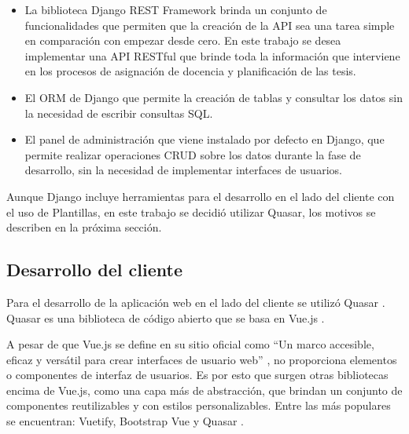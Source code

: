 \begin{itemize}
    \item La biblioteca Django REST Framework brinda un conjunto de funcionalidades 
    que permiten que la creación de la API sea una tarea simple en comparación con empezar desde cero. En este trabajo se desea implementar una API RESTful que brinde toda la 
    información que interviene en los procesos de asignación de docencia y planificación de las 
    tesis. 
    \item El ORM de Django que permite la creación de tablas y consultar los datos sin la necesidad 
    de escribir consultas SQL. 
    \item El panel de administración que viene instalado por defecto en Django, que permite 
    realizar operaciones CRUD sobre los datos durante la fase de desarrollo, sin la 
    necesidad de implementar interfaces de usuarios.
\end{itemize}


Aunque Django incluye herramientas para el desarrollo en el lado del cliente con el uso 
de Plantillas, en este trabajo se decidió utilizar Quasar, los motivos se describen en la próxima sección.


\subsection{Desarrollo del cliente}
Para el desarrollo de la aplicación web en el lado del cliente se utilizó Quasar \cite{quasar}. 
Quasar es una biblioteca de código abierto que se basa en Vue.js \cite{vuejs}.

A pesar de que Vue.js se define en su sitio oficial como 
``Un marco accesible, eficaz y versátil para crear interfaces de usuario web'' \cite{vuejs},
no proporciona elementos o componentes de interfaz de usuarios. Es por esto que surgen  
otras bibliotecas encima de Vue.js, como una capa más de abstracción, que 
brindan un conjunto de componentes reutilizables y con estilos personalizables. Entre 
las más populares se encuentran: Vuetify, Bootstrap Vue y Quasar \cite{vuejs-frameworks}.




